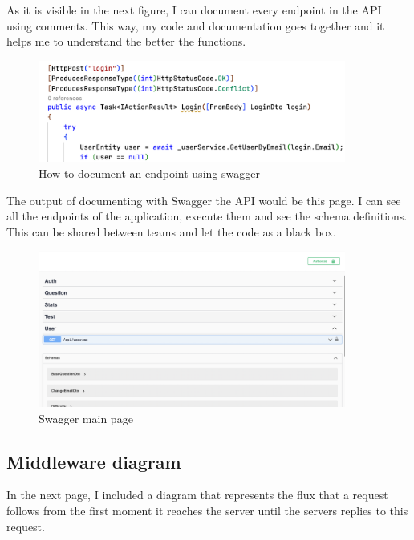     As it is visible in the next figure, I can document every endpoint in the API using comments. This way, my code and documentation goes together and it helps me to understand the better the functions. \\
    \begin{figure}[H]
        \centering
            \includegraphics[width=0.9\textwidth]{assets/swagger_comment.png}
        \caption{How to document an endpoint using swagger}
        \label{fig:impl_swagger_endpoint}
    \end{figure}

    The output of documenting with Swagger the API would be this page. I can see all the endpoints of the application, execute them and see the schema definitions. This can be shared between teams and let the code as a black box. 
    \begin{figure}[H]
        \centering
            \includegraphics[width=0.9\textwidth]{assets/swagger.png}
        \caption{Swagger main page}
        \label{fig:impl_swagger}
    \end{figure}

    \subsection{Middleware diagram}
    In the next page, I included a diagram that represents the flux that a request follows from the first moment it reaches the server until the servers replies to this request. \\

